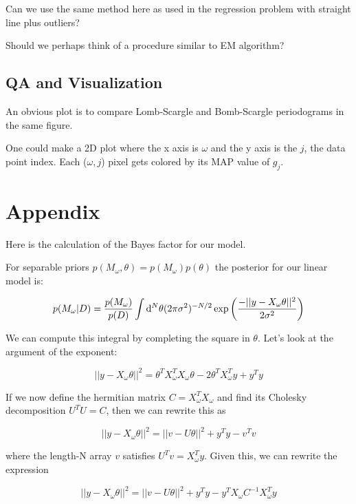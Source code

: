 \documentclass[12pt,pdftex]{article}
\begin{document}
Can we use the same method here as used in the regression problem with straight line plus outliers? 

Should we perhaps think of a procedure similar to EM algorithm? 

 

\subsection{QA and Visualization} 

An obvious plot is to compare Lomb-Scargle and Bomb-Scargle periodograms in the same figure. 

One could make a 2D plot where the x axis is $\omega$ and the y axis is the $j$, the data point index.
Each ($\omega, j$) pixel gets colored by its MAP value of $g_j$. 

\section{Appendix}
Here is the calculation of the Bayes factor for our model.

For separable priors $p(M_\omega,\theta) = p(M_\omega)p(\theta)$ the posterior for our linear model is:

\begin{equation}
  p(M_\omega|D) = \frac{p(M_\omega)}{p(D)}\int{\rm d}^N\theta(2\pi\sigma^2)^{-N/2}\exp\left(\frac{-||y - X_\omega\theta||^2}{2\sigma^2}\right)
\end{equation}

We can compute this integral by completing the square in $\theta$. Let's look at the argument of the exponent:

\begin{equation}
  ||y - X_\omega\theta||^2 = \theta^TX_\omega^TX_\omega\theta - 2\theta^TX_\omega^Ty + y^Ty
\end{equation}

If we now define the hermitian matrix $C = X_\omega^TX_\omega$ and find its Cholesky decomposition $U^TU = C$, then we can rewrite this as

\begin{equation}
  ||y - X_\omega\theta||^2 = ||v - U\theta||^2 + y^Ty - v^Tv
\end{equation}

where the length-N array $v$ satisfies $U^Tv = X_\omega^Ty$. Given this, we can rewrite the expression

\begin{equation}
  ||y - X_\omega\theta||^2 = ||v - U\theta||^2 + y^Ty - y^TX_\omega C^{-1}X_\omega^Ty
\end{equation}
\end{document}
